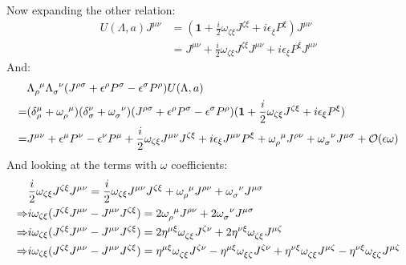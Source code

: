 \documentclass[12pt,a4]{article}
\begin{document}
\begin{enumerate}
\begin{enumerate}
\begin{align*}
    \end{align*}
    Now expanding the other relation:
    \begin{align*}
      U(\Lambda, a) J^{\mu\nu}  &= (\mathbf{1} + \frac{i}{2} \omega_{\zeta\xi} J^{\zeta\xi} + i\epsilon_\xi P^\xi)J^{\mu\nu}\\
                                &= J^{\mu\nu} + \frac{i}{2} \omega_{\zeta\xi} J^{\zeta\xi}J^{\mu\nu} + i\epsilon_\xi P^\xi J^{\mu\nu}
    \end{align*}
    And:
    \begin{align*}
        & \tensor{\Lambda}{_\rho^\mu} \tensor{\Lambda}{_\sigma^\nu} (J^{\rho\sigma} + \epsilon^\rho P^\sigma - \epsilon^\sigma P^\rho) U(\Lambda, a)\\
      = & (\delta{_\rho^\mu} +\tensor{\omega}{_\rho^\mu}) (\delta {_\sigma^\nu} + \tensor{\omega}{_\sigma^\nu}) (J^{\rho\sigma} + \epsilon^\rho P^\sigma - \epsilon^\sigma P^\rho) (\mathbf{1} + \frac{i}{2} \omega_{\zeta\xi} J^{\zeta\xi} + i\epsilon_\xi P^\xi)\\
      = & J^{\mu\nu} + \epsilon^\mu P^\nu - \epsilon^\nu P^\mu + \frac{i}{2} \omega_{\zeta\xi} J^{\mu\nu} J^{\zeta\xi} + i\epsilon_\xi J^{\mu\nu}  P^\xi + \tensor{\omega}{_\rho^\mu}J^{\rho\nu} + \tensor{\omega}{_\sigma^\nu}J^{\mu\sigma} + \mathcal{O}(\epsilon \omega)%
    \end{align*}
    And looking at the terms with $\omega$ coefficients:
    \begin{align*}
                  & \frac{i}{2} \omega_{\zeta\xi} J^{\zeta\xi}J^{\mu\nu} = \frac{i}{2} \omega_{\zeta\xi} J^{\mu\nu} J^{\zeta\xi} + \tensor{\omega}{_\rho^\mu}J^{\rho\nu} + \tensor{\omega}{_\sigma^\nu}J^{\mu\sigma}\\
      \Rightarrow & i \omega_{\zeta\xi} (J^{\zeta\xi}J^{\mu\nu} - J^{\mu\nu} J^{\zeta\xi}) = 2\tensor{\omega}{_\rho^\mu}J^{\rho\nu} + 2\tensor{\omega}{_\sigma^\nu}J^{\mu\sigma}\\
      \Rightarrow & i \omega_{\zeta\xi} (J^{\zeta\xi}J^{\mu\nu} - J^{\mu\nu} J^{\zeta\xi}) = 2\eta^{\mu\xi}\tensor{\omega}{_\zeta_\xi}J^{\zeta\nu} + 2\eta^{\nu\xi}\tensor{\omega}{_\zeta_\xi}J^{\mu\zeta}\\
      \Rightarrow & i \omega_{\zeta\xi} (J^{\zeta\xi}J^{\mu\nu} - J^{\mu\nu} J^{\zeta\xi}) = \eta^{\mu\xi}\tensor{\omega}{_\zeta_\xi}J^{\zeta\nu} - \eta^{\mu\xi}\tensor{\omega}{_\xi_\zeta}J^{\zeta\nu} + \eta^{\nu\xi}\tensor{\omega}{_\zeta_\xi}J^{\mu\zeta} - \eta^{\nu\xi}\tensor{\omega}{_\xi_\zeta}J^{\mu\zeta}\\

\end{align*}
\end{enumerate}
\end{enumerate}
\end{document}

